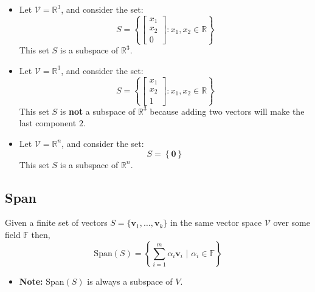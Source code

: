 \begin{example}
    \begin{itemize}
        \item Let \( \mathcal{V} = \mathbb{R}^3 \), and consider the set:
        \[
        S = \left\{ \begin{bmatrix} x_1 \\ x_2 \\ 0 \end{bmatrix} : x_1, x_2 \in \mathbb{R} \right\}
        \]
        This set \( S \) is a subspace of \( \mathbb{R}^3 \).
    
        \item Let \( \mathcal{V} = \mathbb{R}^3 \), and consider the set:
        \[
        S = \left\{ \begin{bmatrix} x_1 \\ x_2 \\ 1 \end{bmatrix} : x_1, x_2 \in \mathbb{R} \right\}
        \]
        This set \( S \) is \textbf{not} a subspace of \( \mathbb{R}^3 \) because adding two vectors will make the last component $2$. 
    
        \item Let \( \mathcal{V} = \mathbb{R}^n \), and consider the set:
        \[
        S = \left\{ \mathbf{0} \right\}
        \]
        This set \( S \) is a subspace of \( \mathbb{R}^n \).
    \end{itemize}
\end{example}

\subsection{Span}
\begin{definition}
    Given a finite set of vectors $S = \{\mathbf{v}_1, \ldots, \mathbf{v}_k\}$ in the same vector space $\mathcal{V}$ over some field $\mathbb{F}$ then, 
    \begin{equation*}
        \text{Span}(S) = \left\{\sum_{i=1}^{m} \alpha_i \mathbf{v}_i \text{ | } \alpha_i \in \mathbb{F}\right\}
    \end{equation*}
    \begin{itemize}
        \item \textbf{Note:} Span$(S)$ is always a subspace of $V$.
    \end{itemize}
\end{definition}

